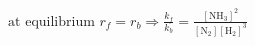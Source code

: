 \documentclass[preview]{standalone}
\begin{document}
\begin{align*}
\text{at equilibrium }r_f=r_b\Rightarrow \frac{k_f}{k_b}=\frac{[\mathrm{NH_3}]^{2}}{[\mathrm{N_2}][\mathrm{H_2}]^{3}}
\end{align*}
\end{document}
